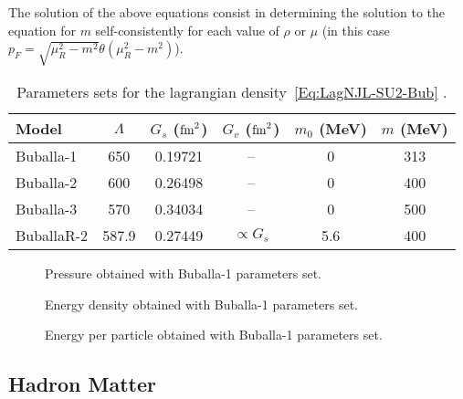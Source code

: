 \documentclass[prc, reprint, amsmath, floatfix, linenumbers,10pt]{revtex4-1}
\begin{document}
The solution of the above equations consist in determining the solution to the equation for $m$ self-consistently for each value of $\rho$ or $\mu$ (in this case $p_F = \sqrt{\mu_R^2 - m^2}\theta(\mu_R^2 - m^2)$).

\begin{table}[!htpb]
\centering
\caption{Parameters sets for the lagrangian density~\eqref{Eq:LagNJL-SU2-Bub} \cite{Buballa1996, Buballa2005}. \label{Tab:Parametros_NJL}}
\begin{ruledtabular}
\begin{tabular}{lccccc}
Model &  $\Lambda$ & $G_s$ ($\rm{fm}^2$) & $G_v$ ($\rm{fm}^2$) & $m_0$ (MeV) & $m$ (MeV) \\
\hline
Buballa-1 & 650 & 0.19721 & -- & 0 & 313 \\
Buballa-2 & 600 & 0.26498 & -- & 0 & 400 \\
Buballa-3 & 570 & 0.34034 & -- & 0 & 500 \\
BuballaR-2 & 587.9 & 0.27449 & $\propto G_s$ & 5.6 & 400 \\
\end{tabular}
\end{ruledtabular}
\end{table}

\begin{figure}
	
	\caption{Pressure obtained with Buballa-1 parameters set. \label{Fig:Ex_pressure}}
\end{figure}

\begin{figure}
	
	\caption{Energy density obtained with Buballa-1 parameters set. \label{Fig:Ex_pressure}}
\end{figure}

\begin{figure}
	
	\caption{Energy per particle obtained with Buballa-1 parameters set. \label{Fig:Ex_pressure}}
\end{figure}

\subsection{Hadron Matter}
\end{document}
